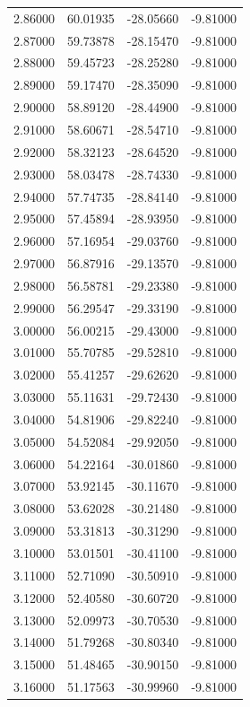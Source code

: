\begin{table}
\begin{tabular}{llll}
2.86000 & 60.01935 & -28.05660 & -9.81000 \\
2.87000 & 59.73878 & -28.15470 & -9.81000 \\
2.88000 & 59.45723 & -28.25280 & -9.81000 \\
2.89000 & 59.17470 & -28.35090 & -9.81000 \\
2.90000 & 58.89120 & -28.44900 & -9.81000 \\
2.91000 & 58.60671 & -28.54710 & -9.81000 \\
2.92000 & 58.32123 & -28.64520 & -9.81000 \\
2.93000 & 58.03478 & -28.74330 & -9.81000 \\
2.94000 & 57.74735 & -28.84140 & -9.81000 \\
2.95000 & 57.45894 & -28.93950 & -9.81000 \\
2.96000 & 57.16954 & -29.03760 & -9.81000 \\
2.97000 & 56.87916 & -29.13570 & -9.81000 \\
2.98000 & 56.58781 & -29.23380 & -9.81000 \\
2.99000 & 56.29547 & -29.33190 & -9.81000 \\
3.00000 & 56.00215 & -29.43000 & -9.81000 \\
3.01000 & 55.70785 & -29.52810 & -9.81000 \\
3.02000 & 55.41257 & -29.62620 & -9.81000 \\
3.03000 & 55.11631 & -29.72430 & -9.81000 \\
3.04000 & 54.81906 & -29.82240 & -9.81000 \\
3.05000 & 54.52084 & -29.92050 & -9.81000 \\
3.06000 & 54.22164 & -30.01860 & -9.81000 \\
3.07000 & 53.92145 & -30.11670 & -9.81000 \\
3.08000 & 53.62028 & -30.21480 & -9.81000 \\
3.09000 & 53.31813 & -30.31290 & -9.81000 \\
3.10000 & 53.01501 & -30.41100 & -9.81000 \\
3.11000 & 52.71090 & -30.50910 & -9.81000 \\
3.12000 & 52.40580 & -30.60720 & -9.81000 \\
3.13000 & 52.09973 & -30.70530 & -9.81000 \\
3.14000 & 51.79268 & -30.80340 & -9.81000 \\
3.15000 & 51.48465 & -30.90150 & -9.81000 \\
3.16000 & 51.17563 & -30.99960 & -9.81000 \\

\end{tabular}
\end{table}
